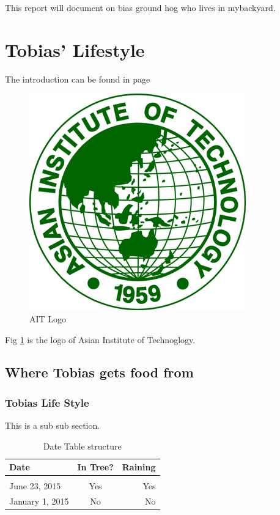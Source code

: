 \documentclass{article}
\begin{document}
This report will document on bias ground hog who lives in mybackyard.

\lipsum[1]

\newpage
\section{Tobias' Lifestyle}
\lipsum[1]

The introduction can be found in page \pageref{sec:intro}

\begin{figure}[H]
	\centering
	\includegraphics[scale=1.7]{images/ait_logo.jpg}
	\caption{AIT Logo}
	\label{fig:ait_logo}
\end{figure}
Fig \ref{fig:ait_logo} is the logo of Asian Institute of Technoglogy.


\subsection{Where Tobias gets food from}
\lipsum[1]

\subsubsection{Tobias Life Style}
This is a sub sub section.


\begin{table}[H]
	\centering
	\begin{tabular}{l c r}
		\bfseries{Date} & In Tree? & Raining \\ \hline \\
		June 23, 2015 & Yes & Yes\\
		January 1, 2015 & No & No\\
	\end{tabular}
	\label{tab:date table structure}
	\caption{Date Table structure}
	
\end{table}
\end{document}

